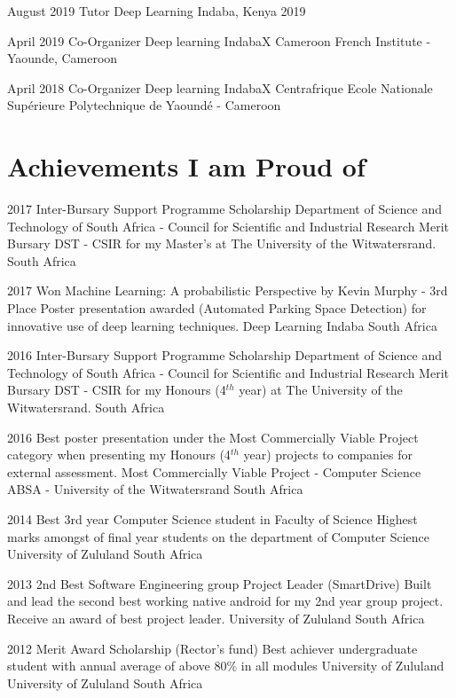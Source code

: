 \documentclass[letterpaper]{moderncv}        %
\begin{document}
\cventry
{August 2019}
{Tutor}
{Deep Learning Indaba, Kenya 2019}
{}
{}
{}

\cventry
{April 2019}
{Co-Organizer Deep learning IndabaX Cameroon}
{French Institute - Yaounde, Cameroon}
{}
{}
{}


\cventry
{April 2018}
{Co-Organizer Deep learning IndabaX Centrafrique}
{Ecole Nationale Supérieure Polytechnique de Yaoundé - Cameroon}
{}
{}
{}


\section{Achievements I am Proud of}

\cventry
{2017}
{Inter-Bursary Support Programme Scholarship}
{Department of Science and Technology of South Africa - Council for Scientific and Industrial Research Merit Bursary}
{DST - CSIR for my Master's at The University of the Witwatersrand.}
{South Africa}
{}

\cventry
{2017}
{Won Machine Learning: A probabilistic Perspective by Kevin Murphy - 3rd Place}
{Poster presentation awarded (Automated Parking Space Detection) for innovative use of deep learning techniques.}
{Deep Learning Indaba}
{South Africa}
{}

\cventry
{2016}
{Inter-Bursary Support Programme Scholarship}
{Department of Science and Technology of South Africa - Council for Scientific and Industrial Research Merit Bursary}
{DST - CSIR for my Honours (4$^{th}$ year) at The University of the Witwatersrand.}
{South Africa}
{}


\cventry
{2016}
{Best poster presentation under the Most Commercially Viable Project category when presenting my Honours (4$^{th}$ year) projects to companies for external assessment.}
{Most Commercially Viable Project - Computer Science}
{ABSA - University of the Witwatersrand}
{South Africa}
{}

\cventry
{2014}
{Best 3rd year Computer Science student in Faculty of Science}
{Highest marks amongst of final year students on the department of Computer Science}
{University of Zululand}
{South Africa}
{}


\cventry
{2013}
{2nd Best Software Engineering group Project Leader (SmartDrive)}
{Built and lead the second best working native android for my 2nd year group project. Receive an award of best project leader.}
{University of Zululand}
{South Africa}
{}

\cventry
{2012}
{Merit Award Scholarship (Rector’s fund)}
{Best achiever undergraduate student with annual average of above 80\% in all modules}
{University of Zululand}
{University of Zululand}
{South Africa}
{}
\end{document}
